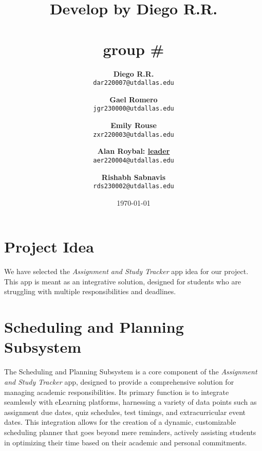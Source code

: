 \documentclass[12pt]{article}
\title{
    \textbf{Develop by Diego R.R.} \\
    \groupname \\
    \small{group} \# \groupnumber \\
}
\author{
    \textbf{Diego R.R.} \\
    \texttt{dar220007@utdallas.edu} \\
    \and 
    \textbf{Gael Romero} \\
    \texttt{jgr230000@utdallas.edu} \\
    \and
    \textbf{Emily Rouse} \\
    \texttt{zxr220003@utdallas.edu} \\
    \and
    \textbf{Alan Roybal: \underline{leader}} \\
    \texttt{aer220004@utdallas.edu} \\
    \and
    \textbf{Rishabh Sabnavis} \\
    \texttt{rds230002@utdallas.edu}
}
\date{\today} %
\newcommand\app{\textit{Assignment and Study Tracker} app\xspace}
\begin{document}
\maketitle %

\section{Project Idea} 
    We have selected the \app idea for our project. This app is meant as an integrative solution, designed for students who are struggling with multiple responsibilities and deadlines.

\newcommand\subsystem{Scheduling and Planning Subsystem\xspace}
\newcommand\dataSubsystem{Data Integration and Synchronization Subsystem\xspace}
\newcommand\alertsSubsystem{Notification, Alerts and Data Interpretation subsystem\xspace}
\newcommand\userSubsystem{User Profile Management and Customization Subsystem\xspace}
\newcommand\securitySubsystem{Security and Privacy Subsystem\xspace}


\section{\subsystem}
    The \subsystem is a core component of the \app, designed to provide a comprehensive solution for managing academic responsibilities. Its primary function is to integrate seamlessly with eLearning platforms, harnessing a variety of data points such as assignment due dates, quiz schedules, test timings, and extracurricular event dates. This integration allows for the creation of a dynamic, customizable scheduling planner that goes beyond mere reminders, actively assisting students in optimizing their time based on their academic and personal commitments.

\newcommand\scheduler{\textit{Scheduler}\xspace}

\newcommand\dataRetrieval{\textit{Data Retrieval Function}\xspace}
\newcommand\persoanlizedScheduler{\textit{Personalized Scheduler Function}\xspace}
\newcommand\dynamicScheduler{\textit{Dynamic Scheduler Adjustment Function}\xspace}
\newcommand\userInterface{\textit{User Interaction and Interface Function}\xspace}
\end{document}
